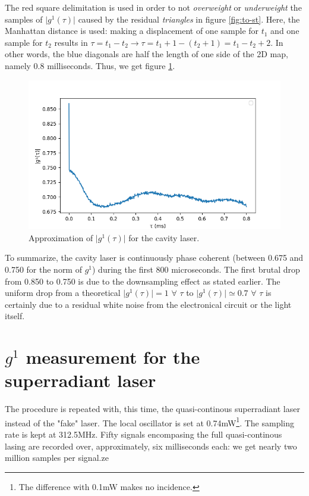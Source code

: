 \documentclass[11pt]{report}
\begin{document}
The red square delimitation is used in order to not \textit{overweight} or \textit{underweight} the samples of $\vert g^1(\tau) \vert$ caused by the residual \textit{triangles} in figure \ref{fig:to-st}. Here, the Manhattan distance is used: making a displacement of one sample for $t_1$ and one sample for $t_2$ results in $\tau = t_1 - t_2 \rightarrow \tau = t_1 + 1 - (t_2 + 1) = t_1 - t_2 + 2$. In other words, the blue diagonals are half the length of one side of the 2D map, namely 0.8 milliseconds. Thus, we get figure \ref{fig:st-stat}.
\begin{figure}[h!]
\centering
\includegraphics[width=0.7\linewidth]{st-stat}
\caption{Approximation of $\vert g^1(\tau) \vert$ for the cavity laser.}
\label{fig:st-stat}
\end{figure}

To summarize, the cavity laser is continuously phase coherent (between 0.675 and 0.750 for the norm of $g^1$) during the first 800 microseconds. The first brutal drop from 0.850 to 0.750 is due to the downsampling effect as stated earlier. The uniform drop from a theoretical $\vert g^1(\tau) \vert = 1 \,\, \forall \,\, \tau $ to $\vert g^1(\tau) \vert \simeq 0.7 \,\, \forall \,\, \tau $ is certainly due to a residual white noise from the electronical circuit or the light itself.

\section{$g^1$ measurement for the superradiant laser}

The procedure is repeated with, this time, the quasi-continous superradiant laser instead of the "fake" laser. The local oscillator is set at 0.74mW\footnote{The difference with 0.1mW makes no incidence.}. The sampling rate is kept at 312.5MHz. Fifty signals encompasing the full quasi-continous lasing are recorded over, approximately, six milliseconds each: we get nearly two million samples per signal.ze
\end{document}
